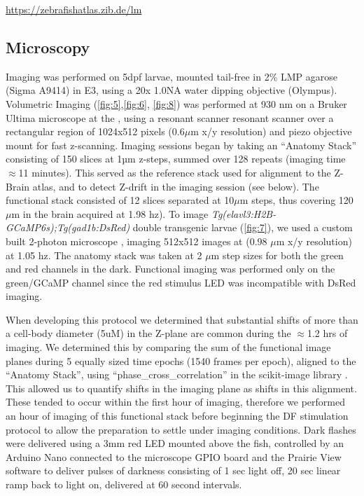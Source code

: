 \documentclass[9pt,lineno]{RandlettLab_elife}
\begin{document}
\href{https://zebrafishatlas.zib.de/lm}{https://zebrafishatlas.zib.de/lm}


\subsection{Microscopy}

Imaging was performed on 5dpf larvae, mounted tail-free in 2\% LMP agarose (Sigma A9414) in E3, using a 20x 1.0NA water dipping objective (Olympus). Volumetric Imaging (\autoref{fig:5},\autoref{fig:6}, \autoref{fig:8})  was performed at 930 nm on a Bruker Ultima microscope at the , using a resonant scanner resonant scanner over a rectangular region of 1024x512 pixels (0.6$\mu$m x/y resolution) and piezo objective mount for fast z-scanning. Imaging sessions began by taking an “Anatomy Stack” consisting of 150 slices at 1µm z-steps, summed over 128 repeats (imaging time $\approx$11 minutes). This served as the reference stack used for alignment to the Z-Brain atlas, and to detect Z-drift in the imaging session (see below). The functional stack consisted of 12 slices separated at 10$\mu$m steps, thus covering 120$\mu$m in the brain acquired at  1.98 hz). To image \emph{Tg(elavl3:H2B-GCaMP6s);Tg(gad1b:DsRed)} double transgenic larvae (\autoref{fig:7}), we used a custom built 2-photon microscope \cite{Haesemeyer2018-ww}, imaging 512x512 images at (0.98 $\mu$m x/y resolution) at 1.05 hz. The anatomy stack was taken at 2 $\mu$m step sizes for both the green and red channels in the dark. Functional imaging was performed only on the green/GCaMP channel since the red stimulus LED was incompatible with DsRed imaging. 

When developing this protocol we determined that substantial shifts of more than a cell-body diameter (5uM) in the Z-plane are common during the $\approx$1.2 hrs of imaging. We determined this by comparing the sum of the functional image planes during 5 equally sized time epochs (1540 frames per epoch), aligned to the “Anatomy Stack”, using “phase\_cross\_correlation” in the scikit-image library \cite{Van_der_Walt2014-hx}. This allowed us to quantify shifts in the imaging plane as shifts in this alignment.  These tended to occur within the first hour of imaging, therefore we performed an hour of imaging of this functional stack before beginning the DF stimulation protocol to allow the preparation to settle under imaging conditions. Dark flashes were delivered using a 3mm red LED mounted above the fish, controlled by an Arduino Nano connected to the microscope GPIO board and the Prairie View software to deliver pulses of darkness consisting of 1 sec light off, 20 sec linear ramp back to light on, delivered at 60 second intervals. 
\end{document}
